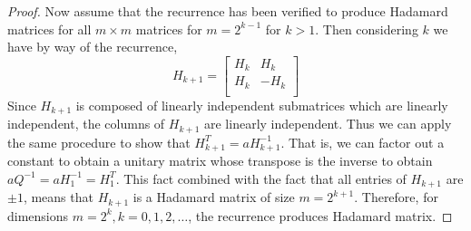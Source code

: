 \documentclass{article}
\begin{document}
\begin{proof}
    Now assume that the recurrence has been verified to produce Hadamard matrices for all $m\times m$ matrices for $m=2^{k-1}$ for $k > 1$. Then considering $k$ we have by way of the recurrence,
    \[H_{k+1} = \begin{bmatrix}
        H_k & H_k\\
        H_k & -H_k\\
    \end{bmatrix} 
    \]
    Since $H_{k+1}$ is composed of linearly independent submatrices which are linearly independent, the columns of $H_{k+1}$ are linearly independent.
    Thus we can apply the same procedure to show that $H_{k+1}^T = aH_{k+1}^{-1}$. That is, we can factor out a constant to obtain a unitary matrix whose transpose is the inverse to obtain $aQ^{-1} = aH_1^{-1} = H_1^T$. This fact combined with the fact that all entries of $H_{k+1}$ are $\pm 1$, means that $H_{k+1}$ is a Hadamard matrix of size $m=2^{k+1}$. Therefore, for dimensions $m=2^k, k = 0, 1, 2, \dots$, the recurrence produces Hadamard matrix.


\end{proof}
\end{document}
